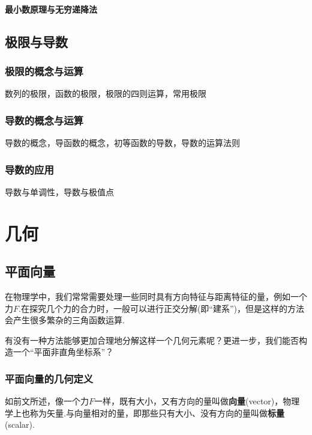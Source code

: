 \documentclass[lang=cn, zihao=5]{elegantbook}
\begin{document}
\subsection{最小数原理与无穷递降法}

\chapter{极限与导数}

\section{极限的概念与运算}

数列的极限，函数的极限，极限的四则运算，常用极限

\section{导数的概念与运算}

导数的概念，导函数的概念，初等函数的导数，导数的运算法则

\section{导数的应用}

导数与单调性，导数与极值点

\part{几何}

\chapter{平面向量}

在物理学中，我们常常需要处理一些同时具有方向特征与距离特征的量，例如一个力$F$.在探究几个力的合力时，一般可以进行正交分解(即“建系”)，但是这样的方法会产生很多繁杂的三角函数运算.

有没有一种方法能够更加合理地分解这样一个几何元素呢？更进一步，我们能否构造一个“平面非直角坐标系”？

\section{平面向量的几何定义}

如前文所述，像一个力$F$一样，既有大小，又有方向的量叫做\textbf{向量}(vector)，物理学上也称为矢量.与向量相对的量，即那些只有大小、没有方向的量叫做\textbf{标量}(scalar).
\end{document}
